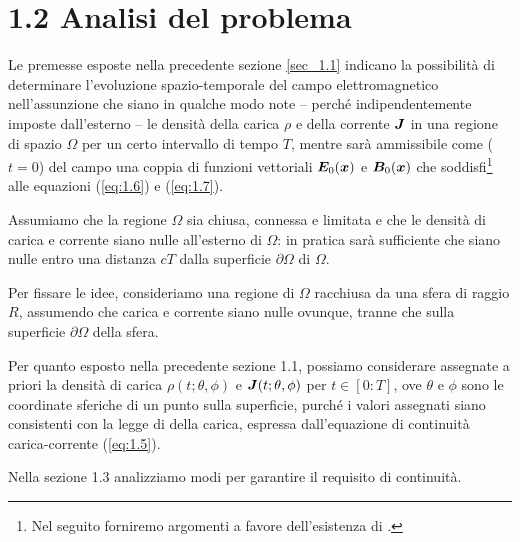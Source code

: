 \section*{1.2 Analisi del problema}\label{sec_1.2}

Le premesse esposte nella precedente sezione \ref{sec_1.1} indicano la possibilità di determinare l'evoluzione spazio-temporale del campo elettromagnetico nell'assunzione che siano in qualche modo note -- perché indipendentemente imposte dall'esterno -- le densità della carica $\rho$ e della corrente $\vb*{J}$ in una regione di spazio $\Omega$ per un certo intervallo di tempo $T$, mentre sarà ammissibile come  ($t=0$) del campo una  coppia di funzioni vettoriali $\vb*{E}_0(\vb*{x})$ e $\vb*{B}_0(\vb*{x})$ che soddisfi\footnote{Nel seguito forniremo argomenti a favore dell'esistenza di .} alle equazioni (\ref{eq:1.6}) e (\ref{eq:1.7}). 

Assumiamo che la regione $\Omega$ sia chiusa, connessa e limitata e che le densità di carica e corrente siano nulle all'esterno di $\Omega$: in pratica sarà sufficiente che siano nulle entro una distanza $c T$ dalla superficie $\partial \Omega$ di $\Omega$.

Per fissare le idee, consideriamo una regione di  $\Omega$ racchiusa da una sfera di raggio $R$, assumendo che carica e corrente siano nulle ovunque, tranne che sulla superficie $\partial \Omega$ della sfera. 

Per quanto esposto nella precedente sezione 1.1, possiamo considerare assegnate a priori la densità di carica $\rho(t; \theta, \phi)$ e $\vb*{J}(t; \theta, \phi)$ per $t \in [0:T]$, ove $\theta$ 
e $\phi$ sono le coordinate sferiche di un punto sulla superficie, purché i valori assegnati siano consistenti con la legge di  della carica, espressa dall'equazione di continuità carica-corrente (\ref{eq:1.5}).

Nella sezione 1.3 analizziamo modi per garantire il requisito di continuità.


